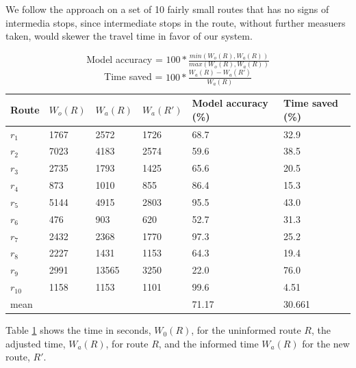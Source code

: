 We follow the approach on a set of 10 fairly small routes that has no signs of intermedia stops, since intermediate stops in the route, without further measuers taken, would skewer the travel time in favor of our system. 
\begin{table}[]
\centering
\begin{tabular}{llllll}
\textbf{Route} & \textbf{$W_o(R)$} & \textbf{$W_a(R)$}  & \textbf{$W_a(R')$} & \textbf{Model accuracy (\%)} & \textbf{Time saved (\%)} \\ \hline
$r_1$          & 1767              & 2572               & 1726               & 68.7                         & 32.9 \\
$r_2$          & 7023              & 4183               & 2574               & 59.6                         & 38.5 \\
$r_3$          & 2735              & 1793               & 1425               & 65.6                         & 20.5 \\
$r_4$          & 873               & 1010               & 855                & 86.4                         & 15.3 \\
$r_5$          & 5144              & 4915               & 2803               & 95.5                         & 43.0 \\
$r_6$          & 476               & 903                & 620                & 52.7                         & 31.3 \\
$r_7$          & 2432              & 2368               & 1770               & 97.3                         & 25.2 \\
$r_8$          & 2227              & 1431               & 1153               & 64.3                         & 19.4 \\
$r_9$          & 2991              & 13565              & 3250               & 22.0                         & 76.0 \\
$r_{10}$       & 1158              & 1153               & 1101               & 99.6                         & 4.51 \\ \hline
mean       	   &                   &                    &                    & 71.17                        & 30.661
\end{tabular}
\caption{Model accuracy = $100 * \frac{min(W_o(R), W_a(R))}{max(W_o(R), W_a(R))}$\\
	     Time saved = $100 * \frac{W_a(R) - W_a(R')}{W_a(R)}$}
\label{tab:eval-results}
\end{table}
Table \ref{tab:eval-results} shows the time in seconds, $W_0(R)$, for the uninformed route $R$,  the adjusted time, $W_a(R)$, for route $R$, and the informed time $W_a(R)$ for the new route, $R'$.

